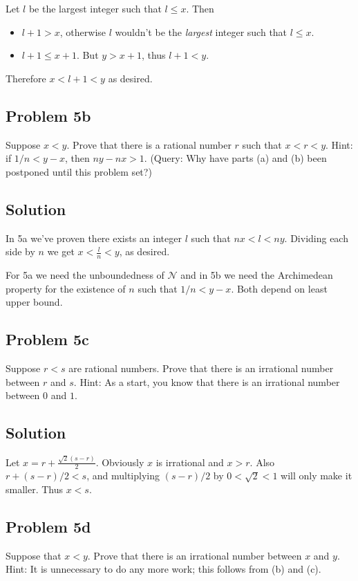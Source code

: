 \vs

Let $l$ be the largest integer such that $l\leq x$. Then
\begin{itemize}
\item $l+1>x$, otherwise $l$ wouldn't be the \textit{largest} integer
  such that $l\leq x$.
\item $l+1\leq x+1$. But $y>x+1$, thus $l+1<y$.
\end{itemize}

Therefore $x<l+1<y$ as desired.

\subsection*{Problem 5b}
Suppose $x<y$. Prove that there is a rational number $r$ such that
$x<r<y$. Hint: if $1/n<y-x$, then $ny-nx>1$. (Query: Why have parts
(a) and (b) been postponed until this problem set?)

\subsection*{Solution}
In 5a we've proven there exists an integer $l$ such that $nx<l<ny$.
Dividing each side by $n$ we get $x<\frac{l}{n}<y$, as desired.

\vs

For 5a we need the unboundedness of $\mathcal{N}$ and in 5b we need the
Archimedean property for the existence of $n$ such that $1/n<y-x$.
Both depend on least upper bound.

\subsection*{Problem 5c}
Suppose $r<s$ are rational numbers. Prove that there is an irrational
number between $r$ and $s$. Hint: As a start, you know that there is
an irrational number between $0$ and $1$.

\subsection*{Solution}
Let $x=r+\frac{\sqrt{2}(s-r)}{2}$. Obviously $x$ is irrational and
$x>r$. Also $r+(s-r)/2<s$, and multiplying $(s-r)/2$ by $0<\sqrt{2}<1$
will only make it smaller. Thus $x<s$.

\subsection*{Problem 5d}
Suppose that $x<y$. Prove that there is an irrational number between
$x$ and $y$. Hint: It is unnecessary to do any more work; this follows
from (b) and (c).

